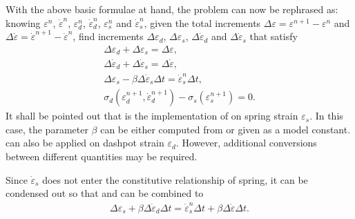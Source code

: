 With the above basic formulae at hand, the problem can now be rephrased as: knowing $\varepsilon^n$, $\dot\varepsilon^n$, $\varepsilon^n_d$, $\dot\varepsilon^n_d$, $\varepsilon^n_s$ and $\dot\varepsilon^n_s$, given the total increments $\Delta\varepsilon=\varepsilon^{n+1}-\varepsilon^n$ and $\Delta\dot\varepsilon=\dot\varepsilon^{n+1}-\dot\varepsilon^n$, find increments $\Delta\varepsilon_d$, $\Delta\varepsilon_s$, $\Delta\dot\varepsilon_d$ and $\Delta\dot\varepsilon_s$ that satisfy
\begin{gather}
\label{eq:condense_a}\Delta\varepsilon_d+\Delta\varepsilon_s=\Delta\varepsilon,\\
\label{eq:condense_b}\Delta\dot\varepsilon_d+\Delta\dot\varepsilon_s=\Delta\dot\varepsilon,\\
\label{eq:condense_c}\Delta\varepsilon_s-\beta\Delta\dot\varepsilon_s\Delta{}t=\dot\varepsilon^n_s\Delta{}t,\\
\label{eq:condense_d}\sigma_d(\varepsilon^{n+1}_d,\dot\varepsilon^{n+1}_d)-\sigma_s(\varepsilon^{n+1}_s)=0.
\end{gather}
It shall be pointed out that  is the implementation of  on spring strain $\varepsilon_s$. In this case, the parameter $\beta$ can be either computed from  or given as a model constant.  can also be applied on dashpot strain $\varepsilon_d$. However, additional conversions between different quantities may be required.

Since $\dot\varepsilon_s$ does not enter the constitutive relationship of spring, it can be condensed out so that  and  can be combined to
\begin{gather}\label{eq:condense_e}
\Delta\varepsilon_s+\beta\Delta\dot\varepsilon_d\Delta{}t=\dot\varepsilon^n_s\Delta{}t+\beta\Delta\dot\varepsilon\Delta{}t.
\end{gather}

